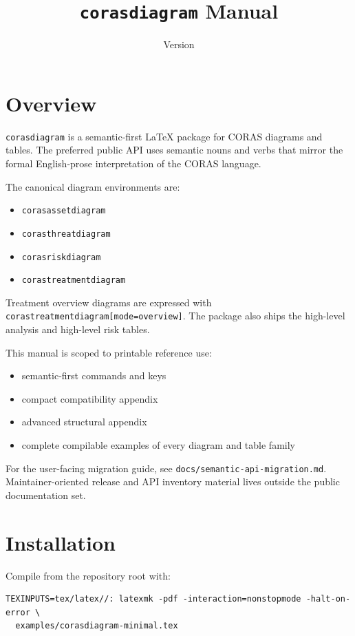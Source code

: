 \documentclass[a4paper]{article}
\title{\texttt{corasdiagram} Manual}
\date{Version \corasdiagramversion}
\begin{document}
\maketitle
\tableofcontents

\section{Overview}

\texttt{corasdiagram} is a semantic-first LaTeX package for CORAS diagrams and
tables. The preferred public API uses semantic nouns and verbs that mirror the
formal English-prose interpretation of the CORAS language.

The canonical diagram environments are:

\begin{itemize}
  \item \texttt{corasassetdiagram}
  \item \texttt{corasthreatdiagram}
  \item \texttt{corasriskdiagram}
  \item \texttt{corastreatmentdiagram}
\end{itemize}

Treatment overview diagrams are expressed with
\texttt{corastreatmentdiagram[mode=overview]}. The package also ships the
high-level analysis and high-level risk tables.

This manual is scoped to printable reference use:

\begin{itemize}
  \item semantic-first commands and keys
  \item compact compatibility appendix
  \item advanced structural appendix
  \item complete compilable examples of every diagram and table family
\end{itemize}

For the user-facing migration guide, see
\texttt{docs/semantic-api-migration.md}. Maintainer-oriented release and API
inventory material lives outside the public documentation set.

\section{Installation}

Compile from the repository root with:

\begin{verbatim}
TEXINPUTS=tex/latex//: latexmk -pdf -interaction=nonstopmode -halt-on-error \
  examples/corasdiagram-minimal.tex
\end{verbatim}
\end{document}
